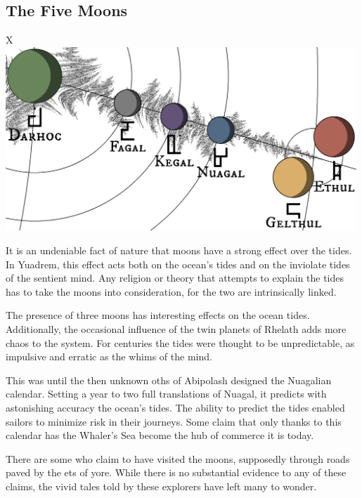 \subsection*{The Five Moons}

\begin{table}[b]%
    \begin{DndTable}[width=\linewidth]{X}
        \centering
        \includegraphics[width=0.99\textwidth]{01yuadrem/img/42moons.png}
    \end{DndTable}
\end{table}

It is an undeniable fact of nature that moons have a strong effect over the tides.
In Yuadrem, this effect acts both on the ocean's tides and on the inviolate tides of the sentient mind.
Any religion or theory that attempts to explain the tides has to take the moons into consideration, for the two are intrinsically linked.

The presence of three moons has interesting effects on the ocean tides.
Additionally, the occasional influence of the twin planets of Rhelath adds more chaos to the system.
For centuries the tides were thought to be unpredictable, as impulsive and erratic as the whims of the mind.

This was until the then unknown oths of Abipolash designed the Nuagalian calendar.
Setting a year to two full translations of Nuagal, it predicts with astonishing accuracy the ocean's tides.
The ability to predict the tides enabled sailors to minimize risk in their journeys.
Some claim that only thanks to this calendar has the Whaler's Sea become the hub of commerce it is today.

There are some who claim to have visited the moons, supposedly through roads paved by the ets of yore.
While there is no substantial evidence to any of these claims, the vivid tales told by these explorers have left many to wonder.

